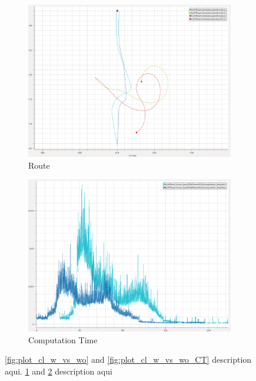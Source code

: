 \begin{figure}[H]
            \begin{subfigure}[b]{0.45\textwidth}
                \centering
                \includegraphics[width=\textwidth]{figs/Chap5/plot_cl_w_vs_wind.png}
                \caption{Route}
                \label{fig:plot_cl_w_vs_wind}
            \end{subfigure}
            \begin{subfigure}[b]{0.45\textwidth}
                \centering
                \includegraphics[width=\textwidth]{figs/Chap5/plot_cl_w_vs_wind_CT.png}
                \caption{Computation Time}
                \label{fig:plot_cl_w_vs_wind_CT}
            \end{subfigure}
        
        \caption{\ref{fig:plot_cl_w_vs_wo} and \ref{fig:plot_cl_w_vs_wo_CT}  description aqui. \ref{fig:plot_cl_w_vs_wind} and \ref{fig:plot_cl_w_vs_wind_CT} description aqui}
        \label{fig:plots_cl}
        \end{figure}
        
